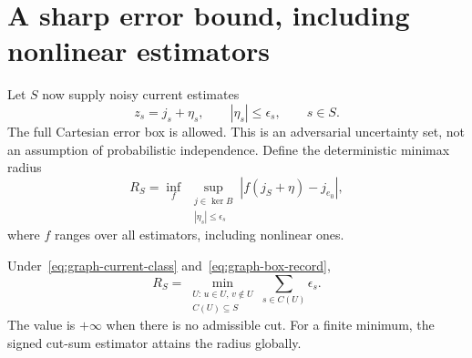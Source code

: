 \section{A sharp error bound, including nonlinear estimators}

Let $S$ now supply noisy current estimates
\begin{equation}
 z_s=j_s+\eta_s,\qquad |\eta_s|\leq\epsilon_s,\qquad s\in S.
 \label{eq:graph-box-record}
\end{equation}
The full Cartesian error box is allowed. This is an adversarial uncertainty
set, not an assumption of probabilistic independence. Define the deterministic
minimax radius
\begin{equation}
 R_S=\inf_f\ \sup_{\substack{j\in\ker B\\|\eta_s|\leq\epsilon_s}}
       \left|f(j_S+\eta)-j_{e_0}\right|,
 \label{eq:graph-minimax-definition}
\end{equation}
where $f$ ranges over all estimators, including nonlinear ones.

\begin{theorem}
\label{thm:graph-exact-radius}
Under~\eqref{eq:graph-current-class} and~\eqref{eq:graph-box-record},
\begin{equation}
 R_S=\min_{\substack{U:\,u\in U,\,v\notin U\\C(U)\subseteq S}}
                 \sum_{s\in C(U)}\epsilon_s.
 \label{eq:graph-exact-radius}
\end{equation}
The value is $+\infty$ when there is no admissible cut. For a finite minimum,
the signed cut-sum estimator attains the radius globally.
\end{theorem}

